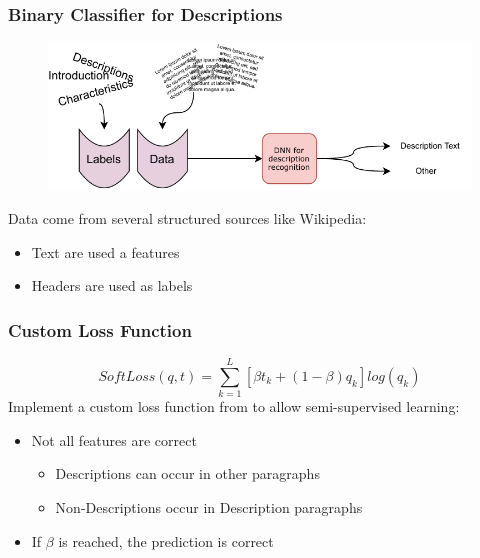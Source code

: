 \documentclass{beamer}
\begin{document}
\begin{frame}
\frametitle{Binary Classifier for Descriptions}
\begin{figure} [htbp]
    \centering
    \includegraphics[width=\textwidth]{figures/midterm_explain_4.pdf}
\end{figure}
Data come from several structured sources like Wikipedia:
\begin{itemize}
    \item Text are used a features
    \item Headers are used as labels
\end{itemize}
\end{frame}


\begin{frame}
\frametitle{Custom Loss Function}
\begin{equation}
 SoftLoss(q, t) = \sum_{k=1}^{L}[\beta t _k + (1- \beta )q _k]log(q _k)
\nonumber\end{equation}
Implement a custom loss function from \textcite{reed_training_2015} to allow semi-supervised learning:
\begin{itemize}
    \item Not all features are correct
    \begin{itemize}
        \item Descriptions can occur in other paragraphs
        \item Non-Descriptions occur in Description paragraphs
    \end{itemize}
    \item If \(\beta\) is reached, the prediction is correct
\end{itemize}
\end{frame}
\end{document}
